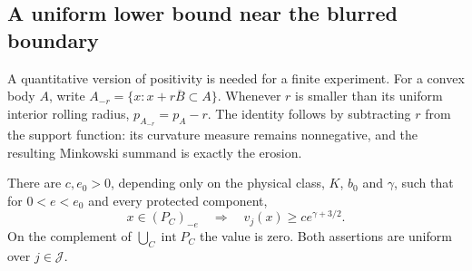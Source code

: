\subsection{A uniform lower bound near the blurred boundary}
A quantitative version of positivity is needed for a finite experiment.
For a convex body $A$, write $A_{-r}=\{x:x+r\overline B\subset A\}$.
Whenever $r$ is smaller than its uniform interior rolling radius,
$p_{A_{-r}}=p_A-r$. The identity follows by subtracting $r$ from the
support function: its curvature measure remains nonnegative, and the
resulting Minkowski summand is exactly the erosion.

\begin{lemma}
\label{lem:cap-mass}
There are $c,e_0>0$, depending only on the physical class, $K$, $b_0$
and $\gamma$, such that for $0<e<e_0$ and every protected component,
\begin{equation}\label{eq:cap-mass}
 x\in(P_C)_{-e}\quad\Longrightarrow\quad
              v_j(x)\ge c e^{\gamma+3/2}.
\end{equation}
On the complement of $\bigcup_C\operatorname{int}P_C$ the value is zero.
Both assertions are uniform over $j\in\mathcal J$.
\end{lemma}
